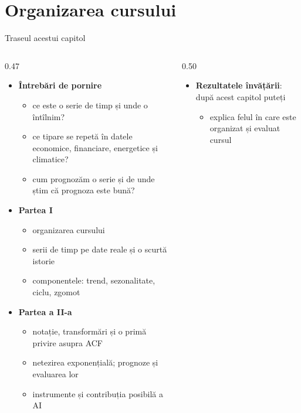 \section{Organizarea cursului}

\begin{frame}{Traseul acestui capitol}
\itemsize{\footnotesize}
\begin{columns}[T]
\begin{column}{0.47\textwidth}
\begin{itemize}
    \item \textbf{Întrebări de pornire}
    \begin{itemize}
        \item ce este o serie de timp și unde o întîlnim?
        \item ce tipare se repetă în datele economice, financiare, energetice și climatice?
        \item cum prognozăm o serie și de unde știm că prognoza este bună?
    \end{itemize}
    \item \textbf{Partea I}
    \begin{itemize}
        \item organizarea cursului
        \item serii de timp pe date reale și o scurtă istorie
        \item componentele: trend, sezonalitate, ciclu, zgomot
    \end{itemize}
    \item \textbf{Partea a II-a}
    \begin{itemize}
        \item notație, transformări și o primă privire asupra ACF
        \item netezirea exponențială; prognoze și evaluarea lor
        \item instrumente și contribuția posibilă a AI
    \end{itemize}
\end{itemize}
\end{column}
\begin{column}{0.50\textwidth}
\begin{itemize}
    \item \textbf{Rezultatele învățării}: după acest capitol puteți
    \begin{itemize}
        \item explica felul în care este organizat și evaluat cursul

\end{itemize}
\end{itemize}
\end{column}
\end{columns}
\end{frame}
